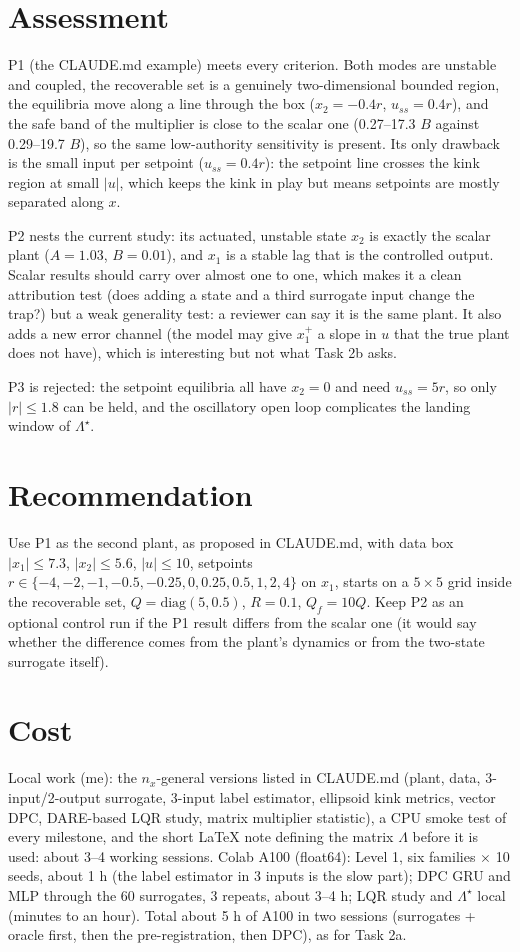 \documentclass[10.5pt]{article}
\begin{document}
\section*{Assessment}
P1 (the CLAUDE.md example) meets every criterion. Both modes are unstable and coupled, the recoverable set is a genuinely
two-dimensional bounded region, the equilibria move along a line through the box ($x_2=-0.4r$, $u_{ss}=0.4r$), and the safe
band of the multiplier is close to the scalar one (0.27--17.3 $B$ against 0.29--19.7 $B$), so the same low-authority
sensitivity is present. Its only drawback is the small input per setpoint ($u_{ss}=0.4r$): the setpoint line crosses the
kink region at small $|u|$, which keeps the kink in play but means setpoints are mostly separated along $x$.

P2 nests the current study: its actuated, unstable state $x_2$ is exactly the scalar plant ($A=1.03$, $B=0.01$), and $x_1$ is a
stable lag that is the controlled output. Scalar results should carry over almost one to one, which makes it a clean
attribution test (does adding a state and a third surrogate input change the trap?) but a weak generality test: a reviewer
can say it is the same plant. It also adds a new error channel (the model may give $x_1^+$ a slope in $u$ that the true plant
does not have), which is interesting but not what Task 2b asks.

P3 is rejected: the setpoint equilibria all have $x_2=0$ and need $u_{ss}=5r$, so only $|r|\le1.8$ can be held, and the
oscillatory open loop complicates the landing window of $\Lambda^\star$.

\section*{Recommendation}
Use P1 as the second plant, as proposed in CLAUDE.md, with data box $|x_1|\le7.3$, $|x_2|\le5.6$, $|u|\le10$, setpoints
$r\in\{-4,-2,-1,-0.5,-0.25,0,0.25,0.5,1,2,4\}$ on $x_1$, starts on a $5\times5$ grid inside the recoverable set,
$Q=\mathrm{diag}(5,0.5)$, $R=0.1$, $Q_f=10Q$. Keep P2 as an optional control run if the P1 result differs from the scalar one
(it would say whether the difference comes from the plant's dynamics or from the two-state surrogate itself).

\section*{Cost}
Local work (me): the $n_x$-general versions listed in CLAUDE.md (plant, data, 3-input/2-output surrogate, 3-input label
estimator, ellipsoid kink metrics, vector DPC, DARE-based LQR study, matrix multiplier statistic), a CPU smoke test of every
milestone, and the short LaTeX note defining the matrix $\Lambda$ before it is used: about 3--4 working sessions.
Colab A100 (float64): Level 1, six families $\times$ 10 seeds, about 1 h (the label estimator in 3 inputs is the slow part);
DPC GRU and MLP through the 60 surrogates, 3 repeats, about 3--4 h; LQR study and $\Lambda^\star$ local (minutes to an hour).
Total about 5 h of A100 in two sessions (surrogates + oracle first, then the pre-registration, then DPC), as for Task 2a.
\end{document}
